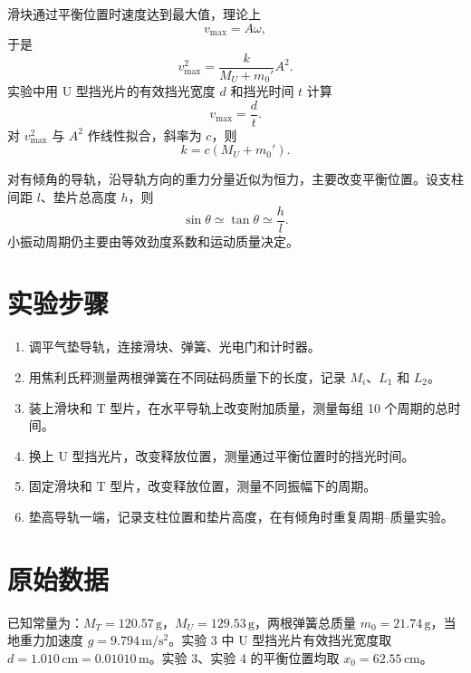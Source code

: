 \documentclass[UTF8,zihao=-4]{ctexart}
\begin{document}
滑块通过平衡位置时速度达到最大值，理论上
\begin{equation}
  v_{\max}=A\omega,
\end{equation}
于是
\begin{equation}
  v_{\max}^2=\frac{k}{M_U+m_0'}A^2 .
\end{equation}
实验中用 U 型挡光片的有效挡光宽度 $d$ 和挡光时间 $t$ 计算
\begin{equation}
  v_{\max}=\frac{d}{t} .
\end{equation}
对 $v_{\max}^2$ 与 $A^2$ 作线性拟合，斜率为 $c$，则
\begin{equation}
  k=c(M_U+m_0') .
\end{equation}

对有倾角的导轨，沿导轨方向的重力分量近似为恒力，主要改变平衡位置。设支柱间距 $l$、垫片总高度 $h$，则
\begin{equation}
  \sin\theta\simeq \tan\theta\simeq \frac{h}{l} .
\end{equation}
小振动周期仍主要由等效劲度系数和运动质量决定。

\section{实验步骤}
\begin{enumerate}[leftmargin=3em]
  \item 调平气垫导轨，连接滑块、弹簧、光电门和计时器。
  \item 用焦利氏秤测量两根弹簧在不同砝码质量下的长度，记录 $M_i$、$L_1$ 和 $L_2$。
  \item 装上滑块和 T 型片，在水平导轨上改变附加质量，测量每组 10 个周期的总时间。
  \item 换上 U 型挡光片，改变释放位置，测量通过平衡位置时的挡光时间。
  \item 固定滑块和 T 型片，改变释放位置，测量不同振幅下的周期。
  \item 垫高导轨一端，记录支柱位置和垫片高度，在有倾角时重复周期--质量实验。
\end{enumerate}

\section{原始数据}
已知常量为：$M_T=120.57\,\mathrm{g}$，$M_U=129.53\,\mathrm{g}$，两根弹簧总质量 $m_0=21.74\,\mathrm{g}$，当地重力加速度 $g=9.794\,\mathrm{m/s^2}$。实验 3 中 U 型挡光片有效挡光宽度取 $d=1.010\,\mathrm{cm}=0.01010\,\mathrm{m}$。实验 3、实验 4 的平衡位置均取 $x_0=62.55\,\mathrm{cm}$。
\end{document}
